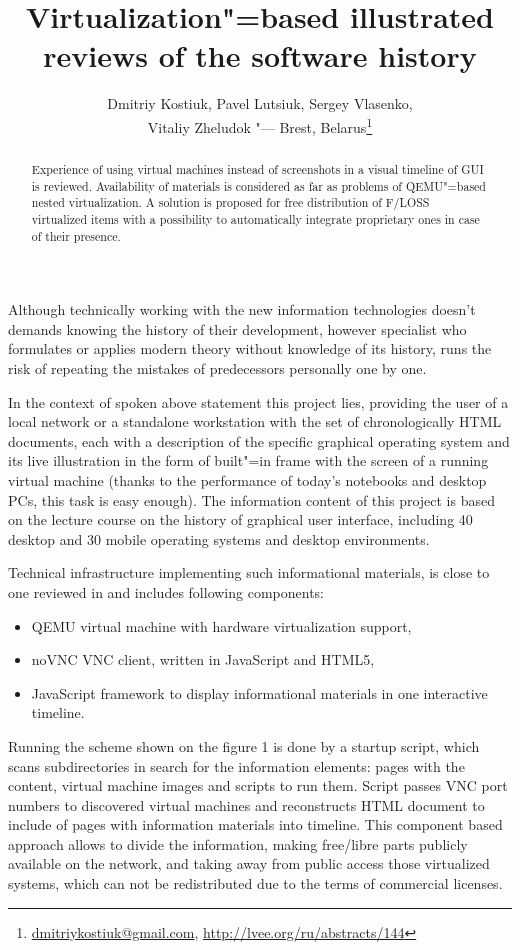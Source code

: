 \documentclass[10pt, a5paper]{article}
\begin{document}
\title{Virtualization"=based illustrated reviews of the software history}
\author{Dmitriy Kostiuk, Pavel Lutsiuk, Sergey Vlasenko, \\ Vitaliy Zheludok "--- Brest, Belarus\footnote{\url{dmitriykostiuk@gmail.com}, \url{http://lvee.org/ru/abstracts/144}}}
\maketitle
\begin{abstract}
Experience of using virtual machines instead of screenshots in a visual timeline of GUI is reviewed. Availability of materials is considered as far as problems of QEMU"=based nested virtualiza\-tion. A solution is proposed for free distribution of F/LOSS virtualized items with a possibility to automatically integrate proprietary ones in case of their presence. 
\end{abstract}
Although technically working with the new information technologies doesn't demands knowing the history of their development, however specialist who formulates or applies modern theory without knowledge of its history, runs the risk of repeating the mistakes of predecessors personally one by one.

In the context of spoken above statement this project lies, providing the user of a local network or a standalone workstation with the set of chronologically HTML documents, each with a description of the specific graphical operating system and its live illustration in the form of built"=in frame with the screen of a running virtual machine (thanks to the performance of today's notebooks and desktop PCs, this task is easy enough). The information content of this project is based on the lecture course on the history of graphical user interface, including 40 desktop and 30 mobile operating systems and desktop environments.

Technical infrastructure implementing such informational materials, is close to one reviewed in \cite{kostiuk1} and includes following components: 
\begin{itemize}
\item QEMU virtual machine with hardware virtualization support,
\item noVNC VNC client, written in JavaScript and HTML5, 
\item JavaScript framework to display informational materials in one interactive timeline.
\end{itemize}

Running the scheme shown on the figure 1 is done by a startup script, which scans subdirectories in search for the information elements: pages with the content, virtual machine images and scripts to run them. Script passes VNC port numbers to discovered virtual machines and reconstructs HTML document to include of pages with information materials into timeline. This component based approach allows to divide the information, making free/libre parts publicly available on the net\-work, and taking away from public access those virtualized systems, which can not be redistributed due to the terms of commercial licenses.
\end{document}
